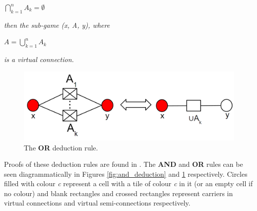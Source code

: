$\bigcap\limits_{k=1}^{n} A_{k} = \emptyset$

\textit{then the sub-game (x, A, y), where}

$A = \bigcup\limits_{k=1}^{n} A_{k}$

\textit{is a virtual connection.}
\newline
\newline

\begin{figure}
    \centering
    \includegraphics[scale = 0.26]{images/OR_deduction.png}
    \caption{The \textbf{OR} deduction rule.}
    \label{fig:or_deduction}
\end{figure}

Proofs of these deduction rules are found in \cite{HierarchicalHex}. The \textbf{AND} and \textbf{OR} rules can be seen diagrammatically in Figures \ref{fig:and_deduction} and \ref{fig:or_deduction} respectively. Circles filled with colour \textit{c} represent a cell with a tile of colour \textit{c} in it (or an empty cell if no colour) and blank rectangles and crossed rectangles represent carriers in virtual connections and virtual semi-connections respectively.




